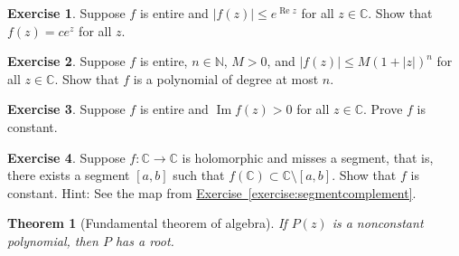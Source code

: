 \documentclass[12pt,openany]{book}
\renewcommand{\Re}{\operatorname{Re}}
\renewcommand{\Im}{\operatorname{Im}}
\newcommand{\sabs}[1]{\lvert {#1} \rvert}
\newcommand{\C}{{\mathbb{C}}}
\newcommand{\N}{{\mathbb{N}}}
\theoremstyle{plain}
\newtheorem{thm}{Theorem}[section]
\theoremstyle{remark}
\theoremstyle{definition}
\newenvironment{exbox}{%
    \def\FrameCommand{\vrule width 1pt \relax\hspace{10pt}}%
    \MakeFramed{\advance\hsize-\width\FrameRestore}%
}{%
    \endMakeFramed
}
\theoremstyle{exercise}
\newtheorem{exercise}{Exercise}[section]
\theoremstyle{example}
\newcommand{\exerciseref}[1]{\hyperref[#1]{Exercise~\ref*{#1}}}
\begin{document}
\begin{exbox}
\begin{exercise}
Suppose $f$ is entire and $\sabs{f(z)} \leq e^{\Re z}$ for all $z \in
\C$.  Show that $f(z) = c e^z$ for all $z$.
\end{exercise}

\begin{exercise}
Suppose $f$ is entire, $n \in \N$, $M > 0$, and
$\sabs{f(z)} \leq M {(1+\sabs{z})}^n$ for all $z \in \C$.
Show that $f$ is a polynomial of degree at most $n$.
\end{exercise}

\begin{exercise}
Suppose $f$ is entire and $\Im f(z) > 0$ for all $z \in \C$.
Prove $f$ is constant.
\end{exercise}

\begin{exercise}
Suppose $f \colon \C \to \C$ is holomorphic and misses a segment,
that is, there exists a segment
$[a,b]$ such that $f(\C) \subset \C \setminus [a,b]$.
Show that $f$ is constant.  Hint: See the map from
\exerciseref{exercise:segmentcomplement}.
\end{exercise}
\end{exbox}

\begin{thm}[Fundamental theorem of algebra]
If $P(z)$ is a nonconstant polynomial, then $P$ has a root.
\end{thm}
\end{document}
